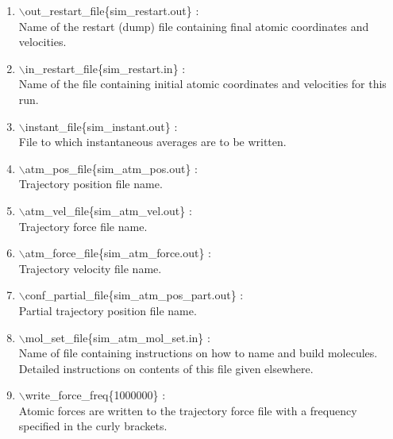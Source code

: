 \documentclass[12pt]{article}
\begin{document}
\begin{enumerate}
 \vspace{0.15in} 
 \item   $\backslash$out\_restart\_file\{sim\_restart.out\} : \\
   Name of the restart (dump) file containing final atomic 
          coordinates and velocities.

 \vspace{0.15in} 
 \item   $\backslash$in\_restart\_file\{sim\_restart.in\} : \\
     Name of the file containing initial atomic coordinates and
     velocities for this run.

 \vspace{0.15in} 
 \item   $\backslash$instant\_file\{sim\_instant.out\} : \\
     File to which instantaneous averages are to be written.

 \vspace{0.15in}
 \item   $\backslash$atm\_pos\_file\{sim\_atm\_pos.out\} : \\
     Trajectory position file name.

 \vspace{0.15in} 
 \item   $\backslash$atm\_vel\_file\{sim\_atm\_vel.out\} : \\
  Trajectory force file name.  

 \vspace{0.15in} 
 \item   $\backslash$atm\_force\_file\{sim\_atm\_force.out\} : \\
     Trajectory velocity file name.

 \vspace{0.15in}
 \item   $\backslash$conf\_partial\_file\{sim\_atm\_pos\_part.out\} : \\
     Partial trajectory position file name.

 \vspace{0.15in} 
 \item   $\backslash$mol\_set\_file\{sim\_atm\_mol\_set.in\} : \\
    Name of file containing instructions on how to name and build molecules.
    Detailed instructions on contents of this file given elsewhere.

 \vspace{0.15in} 
 \item   $\backslash$write\_force\_freq\{1000000\} : \\
   Atomic forces are written to the trajectory force file with a
   frequency specified in the curly brackets.


\end{enumerate}
\end{document}
